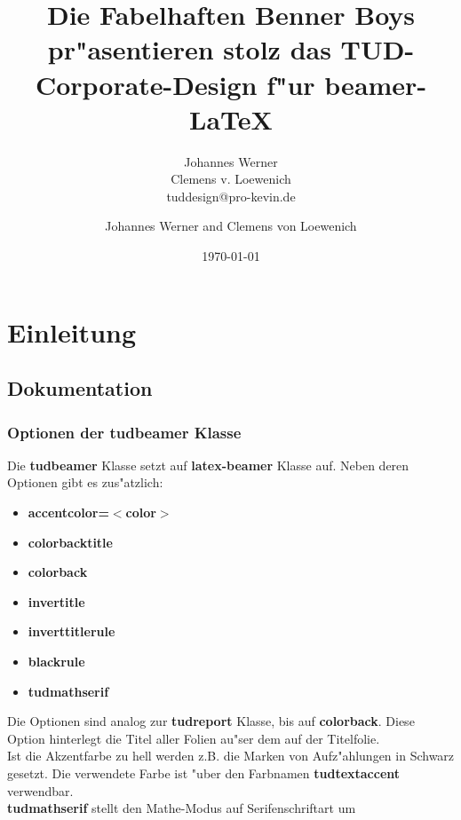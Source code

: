 \documentclass[accentcolor=tud1a,colorbacktitle,inverttitle,landscape,german,presentation,t]{tudbeamer}
\begin{document}
\title[Fabelhafte Benner Boys]{Die Fabelhaften Benner Boys pr"asentieren
stolz das TUD-Corporate-Design f"ur beamer-\LaTeX}
\subtitle{Johannes Werner\\Clemens v. Loewenich\\tuddesign@pro-kevin.de}

\author[J. Werner et al.]{Johannes Werner and Clemens von Loewenich}


\date{\today}

\begin{titleframe}
\end{titleframe}

\section{Einleitung}
	
	\subsection{Dokumentation}
		\begin{frame}
		  \frametitle{Optionen der \textbf{tudbeamer} Klasse}
			Die \textbf{tudbeamer} Klasse setzt auf
			\textbf{latex-beamer} Klasse auf. Neben deren
			Optionen gibt es zus"atzlich:
		  \begin{itemize}
			\item \textbf{accentcolor=$<$color$>$}
			\item \textbf{colorbacktitle}
			\item \textbf{colorback}
			\item \textbf{invertitle}
			\item \textbf{inverttitlerule}
			\item \textbf{blackrule}
			\item \textbf{tudmathserif}
		  \end{itemize}
			Die Optionen sind analog zur \textbf{tudreport} Klasse, bis auf \textbf{colorback}. 
			Diese Option hinterlegt die Titel aller Folien au"ser dem auf der Titelfolie.\\
			\vfill
			Ist die Akzentfarbe zu hell werden z.B. die Marken von
			Aufz"ahlungen in Schwarz gesetzt. Die verwendete
			Farbe ist "uber den Farbnamen \alert{\bf tudtextaccent}
			verwendbar.\\
			\vfill
			\textbf{tudmathserif} stellt den Mathe-Modus auf Serifenschriftart um
		\end{frame}
\end{document}
